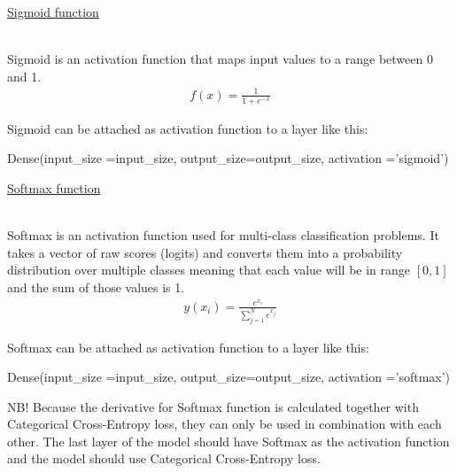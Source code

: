 \documentclass{article}
\begin{document}
    \hypertarget{sigmoid}{\underline{Sigmoid function}} \\

    Sigmoid is an activation function that maps input values 
    to a range between 0 and 1. \\

    \begin{align*}
        f(x) = \frac{1}{1 + e^{-x}}
    \end{align*}

    \begin{center}    
    \end{center}

    Sigmoid can be attached as activation function to a layer like this:
\begin{python}
Dense(input_size =input_size,
      output_size=output_size,
      activation ='sigmoid')
\end{python}
    \pagebreak

    \hypertarget{softmax}{\underline{Softmax function}} \\

    Softmax is an activation function used for multi-class classification
    problems. It takes a vector of raw scores (logits) and converts 
    them into a probability distribution over multiple classes meaning that 
    each value will be in range $[0, 1]$ and the sum of those values is 1.
    \begin{align*}
        y(x_{i}) = \frac{e^{x_{i}}}{\sum_{j=1}^{N} e^{x_{j}}}
    \end{align*}

    Softmax can be attached as activation function to a layer like this:
    \begin{python}
    Dense(input_size =input_size,
          output_size=output_size,
          activation ='softmax')
    \end{python}
    
    NB! Because the derivative for Softmax function is calculated 
    together with Categorical Cross-Entropy loss, they can only be 
    used in combination with each other. The last layer of the model
    should have Softmax as the activation function and the model should 
    use Categorical Cross-Entropy loss. \\
    \pagebreak
\end{document}
